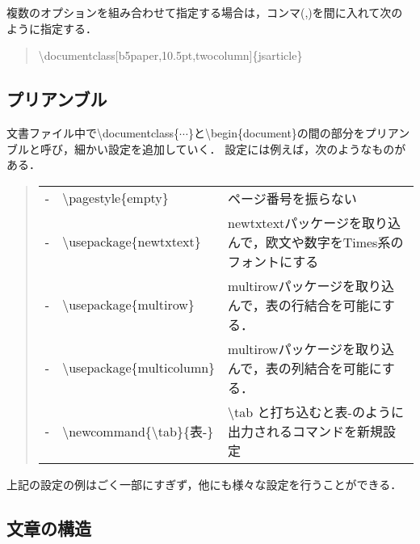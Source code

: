 複数のオプションを組み合わせて指定する場合は，コンマ(,)を間に入れて次のように指定する．
\begin{quote}
  \textbackslash documentclass[b5paper,10.5pt,twocolumn]\{jsarticle\}
\end{quote}

\subsection{プリアンブル}

文書ファイル中で\textbackslash documentclass\{$\cdots$\}と\textbackslash begin\{document\}の間の部分をプリアンブルと呼び，細かい設定を追加していく．
設定には例えば，次のようなものがある．
\begin{table}[H]
  \begin{quote}
    \begin{tabular}{lll}
       - & \textbackslash pagestyle\{empty\} & ページ番号を振らない \\
       - & \textbackslash usepackage\{newtxtext\} & newtxtextパッケージを取り込んで，欧文や数字をTimes系のフォントにする \\
       - & \textbackslash usepackage\{multirow\} & multirowパッケージを取り込んで，表の行結合を可能にする． \\
       - & \textbackslash usepackage\{multicolumn\} & multirowパッケージを取り込んで，表の列結合を可能にする． \\
       - & \textbackslash newcommand\{\textbackslash tab\}\{表-\} & \textbackslash tab と打ち込むと表-のように出力されるコマンドを新規設定 \\
    \end{tabular}    
  \end{quote}
\end{table}
上記の設定の例はごく一部にすぎず，他にも様々な設定を行うことができる．

\subsection{文章の構造}

